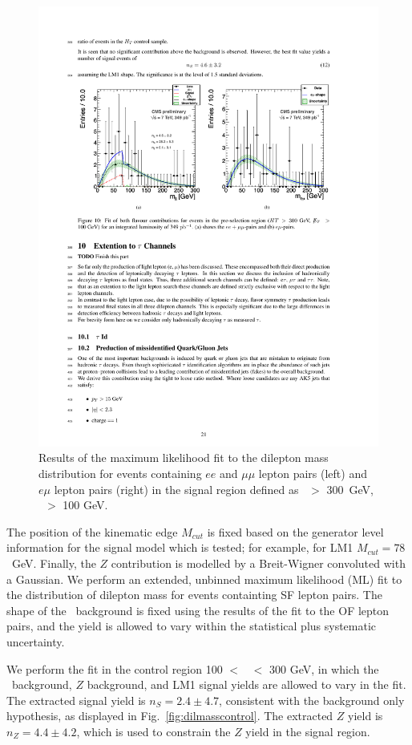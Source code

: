 \begin{figure}[tbh]
\begin{center}
\includegraphics[width=0.75\linewidth]{plots_final/dilmass.pdf}
\caption{\label{fig:dilmass}\protect 
Results of the maximum likelihood fit to the dilepton mass distribution for events containing 
$ee$ and $\mu\mu$ lepton pairs (left) and $e\mu$ lepton pairs (right)  in the signal
region defined as \Ht\ $>$ 300~GeV, \MET\ $>$ 100 GeV.
}
\end{center}
\end{figure}

The position of the kinematic edge $M_{cut}$ is fixed based on the generator level
information for the signal model which is tested; for example, for LM1 
$M_{cut} = 78$~GeV. Finally, the $Z$ contribution is modelled by a Breit-Wigner 
convoluted with a Gaussian. We perform an extended, unbinned maximum 
likelihood (ML) fit to the distribution of dilepton mass for events containting SF lepton pairs. 
The shape of the \ttbar\ background is fixed using the results of the fit to the OF lepton pairs,
and the yield is allowed to vary within the 
statistical plus systematic uncertainty. 

We perform the fit in the control region 100 $<$ \Ht\ $<$ 300 GeV, in
which the \ttbar\ background, $Z$ background, and LM1 signal yields are allowed to vary in the fit. 
The extracted signal yield is $n_S = 2.4 \pm 4.7$, consistent with the background only 
hypothesis, as displayed in Fig.~\ref{fig:dilmasscontrol}. 
The extracted $Z$ yield is $n_Z = 4.4 \pm 4.2$, which is 
used to constrain the $Z$ yield in the signal region. 

